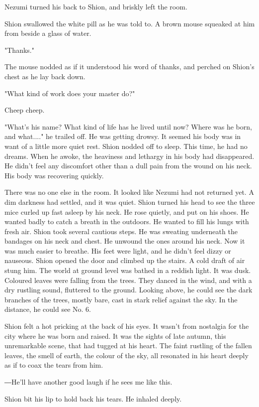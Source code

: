 Nezumi turned his back to Shion, and briskly left the room.

Shion swallowed the white pill as he was told to. A brown mouse squeaked
at him from beside a glass of water.

"Thanks."

The mouse nodded as if it understood his word of thanks, and perched on
Shion's chest as he lay back down.

"What kind of work does your master do?"

Cheep cheep.

"What's his name? What kind of life has he lived until now? Where was he
born, and what...." he trailed off. He was getting drowsy. It seemed his
body was in want of a little more quiet rest. Shion nodded off to sleep.
This time, he had no dreams. When he awoke, the heaviness and lethargy
in his body had disappeared. He didn't feel any discomfort other than a
dull pain from the wound on his neck. His body was recovering quickly.

There was no one else in the room. It looked like Nezumi had not
returned yet. A dim darkness had settled, and it was quiet. Shion turned
his head to see the three mice curled up fast asleep by his neck. He
rose quietly, and put on his shoes. He wanted badly to catch a breath in
the outdoors. He wanted to fill his lungs with fresh air. Shion took
several cautious steps. He was sweating underneath the bandages on his
neck and chest. He unwound the ones around his neck. Now it was much
easier to breathe. His feet were light, and he didn't feel dizzy or
nauseous. Shion opened the door and climbed up the stairs. A cold draft
of air stung him. The world at ground level was bathed in a reddish
light. It was dusk. Coloured leaves were falling from the trees. They
danced in the wind, and with a dry rustling sound, fluttered to the
ground. Looking above, he could see the dark branches of the trees,
mostly bare, cast in stark relief against the sky. In the distance, he
could see No. 6.

Shion felt a hot pricking at the back of his eyes. It wasn't from
nostalgia for the city where he was born and raised. It was the sights
of late autumn, this unremarkable scene, that had tugged at his heart.
The faint rustling of the fallen leaves, the smell of earth, the colour
of the sky, all resonated in his heart deeply as if to coax the tears
from him.

―He'll have another good laugh if he sees me like this.

Shion bit his lip to hold back his tears. He inhaled deeply.

